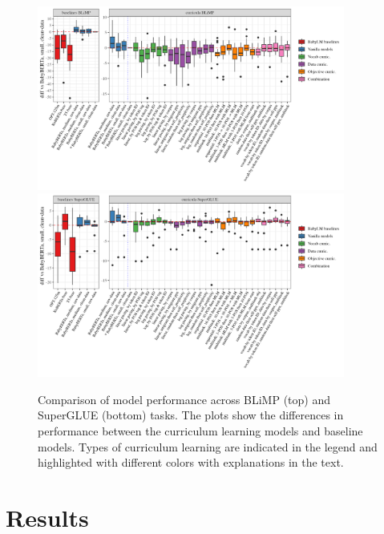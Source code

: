 \begin{figure}[htbp]
    \centering
    \includegraphics[width=0.9\textwidth]{chapters/climb/figures/babylm_blimp_diffs_boxplots.png}
    \vspace{1em}  %
    \includegraphics[width=0.9\textwidth]{chapters/climb/figures/babylm_superglue_diffs_boxplots.png}
    \caption{Comparison of model performance across BLiMP (top) and SuperGLUE (bottom) tasks. The plots show the differences in performance between the curriculum learning models and baseline models. Types of curriculum learning are indicated in the legend and highlighted with different colors with explanations in the text.}
    \label{fig:combined-boxplots}
\end{figure}


\section{Results}

